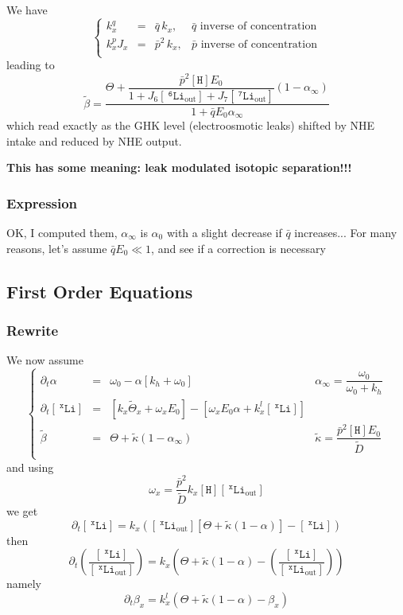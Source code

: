 \documentclass[aps,onecolumn,12pt]{revtex4}
\newcommand{\mychem}[1]{\mathtt{#1}}
\newcommand{\myconc}[1]{\left\lbrack{#1}\right\rbrack}
\newcommand{\spLi}[1]{{~^{\mychem{#1}}\mychem{Li}}}
\newcommand{\Li}[1]{\myconc{\spLi{#1}}}
\newcommand{\spLiOut}[1]{{\spLi{#1}}_{\mathrm{out}}}
\newcommand{\LiOut}[1]{\myconc{\spLiOut{#1}}}
\newcommand{\spproton}{\mychem{H}}
\newcommand{\proton}{\myconc{\spproton}}
\begin{document}
We have
\begin{equation}
\left\lbrace
	\begin{array}{rcll}
	k_x^q    & = & \bar{q}\,k_x,  &  \bar{q}\text{ inverse of concentration}\\
	k_x^pJ_x & = & \bar{p}^2\,k_x, & \bar{p}\text{ inverse of concentration}\\
	\end{array}
\right.
\end{equation}
leading to
\begin{equation}
	\tilde\beta = \dfrac{\Theta+\dfrac{\bar{p}^2 \proton E_0}{1+J_6\LiOut{6}+J_7\LiOut{7}} \left(1-\alpha_\infty\right)}{1+\bar{q}E_0\alpha_\infty}
\end{equation}
which read exactly as the GHK level (electroosmotic leaks) shifted by NHE intake and reduced by NHE output.

\centerline{\bf This has some meaning: leak modulated isotopic separation!!!}

\subsubsection{Expression}
OK, I computed them, $\alpha_\infty$ is $\alpha_0$ with a slight decrease if $\bar{q}$ increases...
For many reasons, let's assume $\bar{q}E_0\ll 1$, and see if a correction is necessary

\subsection{First Order Equations}
\subsubsection{Rewrite}
We now assume
\begin{equation}
\left\lbrace
\begin{array}{rcl|l}
	\partial_t\alpha    & = & \omega_0 - \alpha\left\lbrack k_h+\omega_0\right\rbrack & {\alpha_\infty} = \dfrac{\omega_0}{\omega_0+k_h}\\
	\partial_t\Li{x} & = & \left\lbrack k_x\tilde{\Theta}_x+\omega_x E_0\right\rbrack
		-\left\lbrack
			\omega_x E_0\alpha +  k_x^l\Li{x}
		\right\rbrack & \\
	\tilde{\beta} & = & \Theta + \tilde{\kappa} \left(1-\alpha_\infty\right) & \tilde\kappa = \dfrac{\bar{p}^2 \proton E_0}{\tilde{D}} \\
	\end{array}
\right.
\end{equation}
and using
$$
	\omega_x =  \dfrac{\bar{p}^2}{\tilde{D}} k_x \proton \LiOut{x}
$$
we get
$$
	\partial_t\Li{x} =
	  k_x \left(\LiOut{x} \left[ \Theta + \tilde\kappa \left(1-\alpha\right)\right] - \Li{x} \right)
$$
then
\begin{equation}
	\partial_t\left( \dfrac{\Li{x}}{\LiOut{x}} \right)= k_x \left( \Theta + \tilde\kappa(1-\alpha) - \left( \dfrac{\Li{x}}{\LiOut{x}} \right)\right)
\end{equation}
namely
\begin{equation}
	\partial_t \beta_x =  k_x^l \left( \Theta + \tilde\kappa(1-\alpha) - \beta_x\right)
\end{equation}
\end{document}
